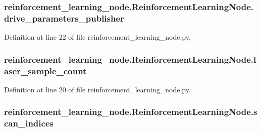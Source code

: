 \subsubsection[{\texorpdfstring{drive\+\_\+parameters\+\_\+publisher}{drive_parameters_publisher}}]{\setlength{\rightskip}{0pt plus 5cm}reinforcement\+\_\+learning\+\_\+node.\+Reinforcement\+Learning\+Node.\+drive\+\_\+parameters\+\_\+publisher}\hypertarget{classreinforcement__learning__node_1_1_reinforcement_learning_node_ae39f8b46185427cbb5ef6f981e966f61}{}\label{classreinforcement__learning__node_1_1_reinforcement_learning_node_ae39f8b46185427cbb5ef6f981e966f61}


Definition at line 22 of file reinforcement\+\_\+learning\+\_\+node.\+py.

\subsubsection[{\texorpdfstring{laser\+\_\+sample\+\_\+count}{laser_sample_count}}]{\setlength{\rightskip}{0pt plus 5cm}reinforcement\+\_\+learning\+\_\+node.\+Reinforcement\+Learning\+Node.\+laser\+\_\+sample\+\_\+count}\hypertarget{classreinforcement__learning__node_1_1_reinforcement_learning_node_ad80aca8685a3a3301d4638b4899f7f0b}{}\label{classreinforcement__learning__node_1_1_reinforcement_learning_node_ad80aca8685a3a3301d4638b4899f7f0b}


Definition at line 20 of file reinforcement\+\_\+learning\+\_\+node.\+py.

\subsubsection[{\texorpdfstring{scan\+\_\+indices}{scan_indices}}]{\setlength{\rightskip}{0pt plus 5cm}reinforcement\+\_\+learning\+\_\+node.\+Reinforcement\+Learning\+Node.\+scan\+\_\+indices}\hypertarget{classreinforcement__learning__node_1_1_reinforcement_learning_node_ab8d594d92bd16625c93127ad0b9fcb72}{}\label{classreinforcement__learning__node_1_1_reinforcement_learning_node_ab8d594d92bd16625c93127ad0b9fcb72}


